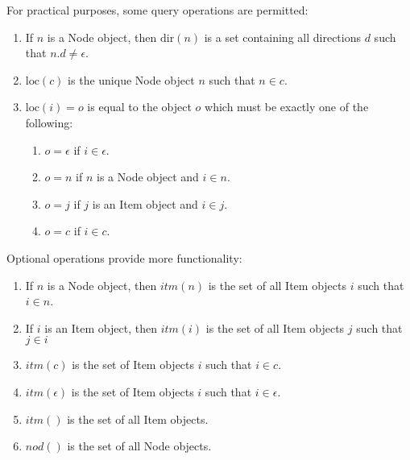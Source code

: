 \documentclass{amsart}
\begin{document}
For practical purposes, some query operations are permitted:

\begin{enumerate}
\item If $n$ is a Node object, then $\mathrm{dir}(n)$ is a set containing all directions  $d$ such that $n.d\ne\epsilon$.
\item $\mathrm{loc}(c)$ is the unique Node object $n$ such that $n\in{c}$.
\item $\mathrm{loc}(i)=o$ is equal to the object $o$ which must be exactly one of the following:
\begin{enumerate}
\item $o=\epsilon$ if $i\in\epsilon$.
\item $o=n$ if $n$ is a Node object and $i\in{n}$.
\item $o=j$ if  $j$ is an Item object and $i\in{j}$.
\item $o=c$ if $i\in{c}$.
\end{enumerate}
\end{enumerate}

Optional operations provide more functionality:
\begin{enumerate}
\item If $n$ is a Node object, then $itm(n)$ is the set of all Item objects $i$ such that $i\in{n}$.
\item If $i$ is an Item object, then $itm(i)$ is the set of all Item objects $j$ such that $j\in{i}$
\item $itm(c)$ is the set of Item objects $i$ such that $i\in{c}$.
\item $itm(\epsilon)$ is the set of Item objects $i$ such that $i\in\epsilon$.
\item $itm()$ is the set of all Item objects.
\item $nod()$ is the set of all Node objects.
\end{enumerate}
\end{document}
